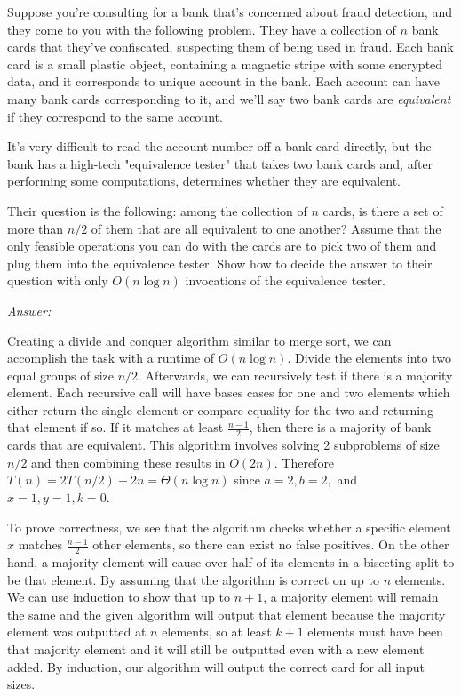 \documentclass[12pt]{article}
\newenvironment{problem}[2][Problem]{\begin{trivlist}
\item[\hskip \labelsep {\bfseries #1}\hskip \labelsep {\bfseries #2.}]}{\end{trivlist}}
\begin{document}
\begin{problem}{3}
    Suppose you're consulting for a bank that's concerned about fraud detection, and they come to you with the following problem. They have a collection of $n$ bank cards that they've confiscated, suspecting them of being used in fraud. Each bank card is a small plastic object, containing a magnetic stripe with some encrypted data, and it corresponds to unique account in the bank. Each account can have many bank cards corresponding to it, and we'll say two bank cards are \textit{equivalent} if they correspond to the same account.

    It's very difficult to read the account number off a bank card directly, but the bank has a high-tech "equivalence tester" that takes two bank cards and, after performing some computations, determines whether they are equivalent.

    Their question is the following: among the collection of $n$ cards, is there a set of more than $n/2$ of them that are all equivalent to one another? Assume that the only feasible operations you can do with the cards are to pick two of them and plug them into the equivalence tester. Show how to decide the answer to their question with only $O(n\log n)$ invocations of the equivalence tester.
\end{problem}
\textit{Answer:} 

Creating a divide and conquer algorithm similar to merge sort, we can accomplish the task with a runtime of $O(n\log n)$. Divide the elements into two equal groups of size $n/2$. Afterwards, we can recursively test if there is a majority element. Each recursive call will have bases cases for one and two elements which either return the single element or compare equality for the two and returning that element if so. If it matches at least $\frac{n-1}{2}$, then there is a majority of bank cards that are equivalent. This algorithm involves solving 2 subproblems of size $n/2$ and then combining these results in $O(2n)$. Therefore $T(n)=2T(n/2)+2n=\Theta(n\log n)$ since $a=2,b=2,$ and $x=1,y=1,k=0$.

To prove correctness, we see that the algorithm checks whether a specific element $x$ matches $\frac{n-1}{2}$ other elements, so there can exist no false positives. On the other hand, a majority element will cause over half of its elements in a bisecting split to be that element. By assuming that the algorithm is correct on up to $n$ elements. We can use induction to show that up to $n+1$, a majority element will remain the same and the given algorithm will output that element because the majority element was outputted at $n$ elements, so at least $k+1$ elements must have been that majority element and it will still be outputted even with a new element added. By induction, our algorithm will output the correct card for all input sizes. 
\end{document}

